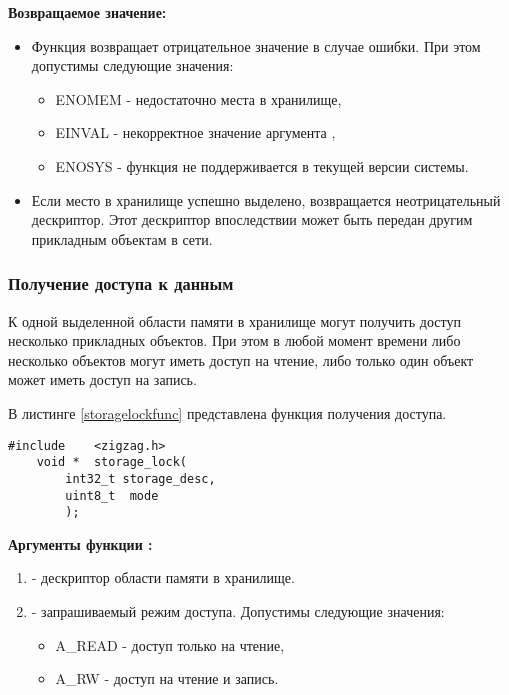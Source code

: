 {\bfseries Возвращаемое значение:}

{\itshape
\begin{itemize}
\item Функция возвращает отрицательное значение в случае ошибки. При этом допустимы следующие значения:
    \begin{itemize}
        \item ENOMEM - недостаточно места в хранилище,
        \item EINVAL - некорректное значение аргумента ,
        \item ENOSYS - функция не поддерживается в текущей версии системы.
    \end{itemize}
\item Если место в хранилище успешно выделено, возвращается неотрицательный дескриптор. Этот дескриптор впоследствии
может быть передан другим прикладным объектам в сети.
\end{itemize}
}

\subsubsection{Получение доступа к данным}

К одной выделенной области памяти в хранилище могут получить доступ несколько прикладных объектов. При этом
в любой момент времени либо несколько объектов могут иметь доступ на чтение, либо только один объект может иметь доступ на запись.

В листинге \ref{storagelockfunc} представлена функция получения доступа.

\begin{lstlisting}[caption=Функция \myfunc{storage\_lock()} - доступ к хранилищу, label=storagelockfunc ]
    #include    <zigzag.h>
    void *  storage_lock(
        int32_t storage_desc,
        uint8_t  mode
        );
\end{lstlisting}

{\bfseries Аргументы функции :}

{\itshape
\begin{enumerate} 
\item {} - дескриптор области памяти в хранилище.
\item {} - запрашиваемый режим доступа. Допустимы следующие значения:
    \begin{itemize}
        \item A\_READ - доступ только на чтение,
        \item A\_RW - доступ на чтение и запись.
    \end{itemize}
\end{enumerate}
}

